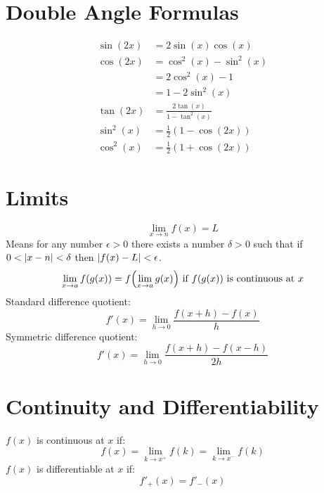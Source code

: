 \documentclass[12pt]{article}
\DeclarePairedDelimiter\abs{\lvert}{\rvert}
\DeclarePairedDelimiter\paren{(}{)}
\newcommand*{\fixmath}{%
  \makebox{}\vspace{\glueexpr-\baselineskip-\abovedisplayskip}}
\newenvironment{fixaskip}{\setlength{\abovedisplayskip}{0pt}\fixmath%
  \ignorespaces}{\ignorespacesafterend}
\newenvironment{fixbskip}{\setlength{\belowdisplayskip}{0pt}\ignorespaces}%
  {\ignorespacesafterend}
\newenvironment{fixskip}{\setlength{\abovedisplayskip}{0pt}%
  \setlength{\belowdisplayskip}{0pt}\fixmath\ignorespaces}%
  {\ignorespacesafterend}
\begin{document}
\section*{Double Angle Formulas}
\begin{fixskip}
  \begin{align*}
    \sin(2x) &= 2\sin(x)\cos(x)\\
    \cos(2x) &= \cos^2(x) - \sin^2(x)\\
      &= 2\cos^2(x) - 1\\
      &= 1-2\sin^2(x)\\
    \tan(2x) &= \frac{2\tan(x)}{1 - \tan^2(x)}\\
    \sin^2(x) &= \frac{1}{2}(1-\cos(2x))\\
    \cos^2(x) &= \frac{1}{2}(1+\cos(2x))
  \end{align*}
\end{fixskip}
\section*{Limits}
\begin{fixaskip}
  \[
    \lim_{x \to n} f(x) = L
  \]
\end{fixaskip}
Means for any number \(\epsilon > 0\) there exists a number \(\delta > 0\) such
that if \(0 < \abs*{x-n} < \delta\) then \(\abs*{f(x)-L} < \epsilon\).
\[
  \lim_{x \to a}f(g(x)) = f\paren*{\lim_{x \to a}g(x)} \text{ if } f(g(x))
  \text{ is continuous at } x
\]
Standard difference quotient:
\[
  f'(x) = \lim_{h \to 0}\frac{f(x+h) - f(x)}{h}
\]
Symmetric difference quotient:
\begin{fixbskip}
  \[
    f'(x) = \lim_{h \to 0}\frac{f(x+h) - f(x-h)}{2h}
  \]
\end{fixbskip}
\section*{Continuity and Differentiability}
\(f(x)\) is continuous at \(x\) if:
\[
  f(x) = \lim_{k \to x^+}f(k) = \lim_{k \to x^-}f(k)
\]
\(f(x)\) is differentiable at \(x\) if:
\begin{fixbskip}
  \[
    f'_+(x) = f'_-(x)
  \]
\end{fixbskip}
\end{document}
